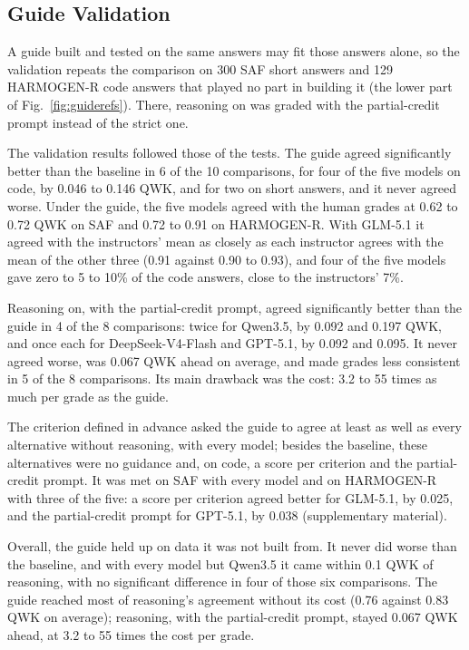 \subsection{Guide Validation}
\label{sec:validation}

A guide built and tested on the same answers may fit those answers alone, so the validation repeats the comparison
on 300 SAF short answers and 129 HARMOGEN-R code answers that played no part in building it (the lower part of
Fig.~\ref{fig:guiderefs}). There, reasoning on was graded with the partial-credit prompt instead of the strict one.

The validation results followed those of the tests. The guide agreed significantly better than the baseline in 6
of the 10 comparisons, for four of the five models on code, by 0.046 to 0.146 QWK, and for two on short answers,
and it never agreed worse. Under the guide, the five
models agreed with the human grades at 0.62 to 0.72 QWK on SAF and 0.72 to 0.91 on HARMOGEN-R. With GLM-5.1 it
agreed with the instructors' mean as closely as each instructor agrees with the mean of the other three (0.91
against 0.90 to 0.93), and four of the five models gave zero to 5 to 10\% of the code answers, close to the
instructors' 7\%.

Reasoning on, with the partial-credit prompt, agreed significantly better than the guide in 4 of the 8 comparisons: twice for Qwen3.5, by 0.092 and
0.197 QWK, and once each for DeepSeek-V4-Flash and GPT-5.1, by 0.092 and 0.095. It never agreed worse, was 0.067 QWK ahead on average, and made grades
less consistent in 5 of the 8 comparisons. Its main drawback was the cost: 3.2 to 55 times as much per grade as the
guide.

The criterion defined in advance asked the guide to agree at least as well as every alternative without reasoning,
with every model; besides the baseline, these alternatives were no guidance and, on code, a score per criterion and
the partial-credit prompt. It was met on SAF with every model and on HARMOGEN-R with three of the five: a score per
criterion agreed better for GLM-5.1, by 0.025, and the partial-credit prompt for GPT-5.1, by 0.038 (supplementary
material).

Overall, the guide held up on data it was not built from. It never did worse than the baseline, and with every model
but Qwen3.5 it came within 0.1 QWK of reasoning, with no significant difference in four of those six comparisons.
The guide reached most of reasoning's agreement without its cost (0.76 against 0.83 QWK on average);
reasoning, with the partial-credit prompt, stayed 0.067 QWK ahead, at 3.2 to 55 times the cost per grade.
